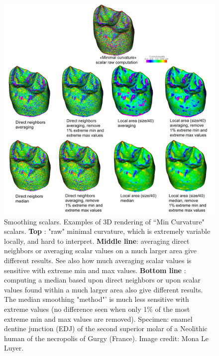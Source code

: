 \begin{figure}
  \centering
  \includegraphics[scale=0.4]{images/11/scalar_smoothing_example.jpg} 
	\caption{ 
Smoothing scalars. Examples of 3D rendering of ``Min Curvature" scalars. \textbf{Top} : "raw" minimal curvature, which is extremely variable locally, and hard to interpret.  \textbf{Middle line}: averaging direct neighbors  or averaging scalar values on a much larger area give different results. See also how much averaging scalar values is sensitive with extreme min and max values. \textbf{Bottom line} : computing a median based upon direct neighbors  or upon scalar values found within a much larger area also give different results. The median smoothing "method"' is much less sensitive with extreme values (no difference seen when only 1\% of the most extreme min and max values are removed).  Specimen: enamel dentine junction (EDJ) of the second superior molar of a  Neolithic human of the necropolis of Gurgy (France). Image credit: Mona Le Luyer.	
	}
\label{smoothing_scalars_example}
\end{figure}


